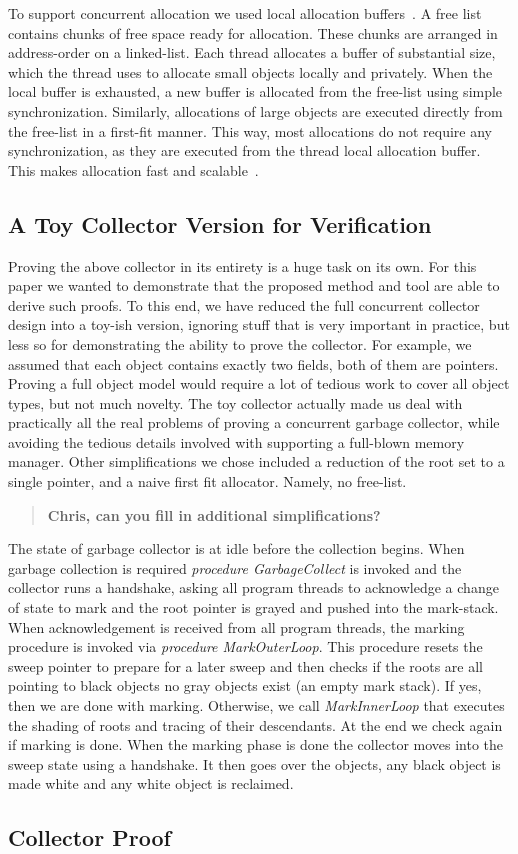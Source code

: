To support concurrent allocation we used local allocation buffers~\cite{borm02a,bara05}. A free list contains chunks of free space ready for allocation. These chunks are arranged in address-order on a linked-list. Each thread allocates a buffer of substantial size, which the thread uses to allocate small objects locally and privately. When the local buffer is exhausted, a new buffer is allocated from the free-list using simple synchronization. Similarly, allocations of large objects are executed directly from the free-list in a first-fit manner. This way, most allocations do not require any synchronization, as they are executed from the thread local allocation buffer. This makes allocation fast and scalable~\cite{borm02a,bara05}. 

\subsection{A Toy Collector Version for Verification}  
Proving the above collector in its entirety is a huge task on its own. For this paper we wanted to demonstrate that the proposed method and tool are able to derive such proofs. To this end, we have reduced the full concurrent collector design into a toy-ish version, ignoring stuff that is very important in practice, but less so for demonstrating the ability to prove the collector. For example, we assumed that each object contains exactly two fields, both of them are pointers. Proving a full object model would require a lot of tedious work to cover all object types, but not much novelty. The toy collector actually made us deal with practically all the real problems of proving a concurrent garbage collector, while avoiding the tedious details involved with supporting a full-blown memory manager. Other simplifications we chose included a reduction of the root set to a single pointer, and a naive first fit allocator. Namely, no free-list. 

\begin{quote}
{\bf Chris, can you fill in additional simplifications?}
\end{quote}

The state of garbage collector is at {\sc idle} before the collection begins. When garbage collection is required {\em procedure GarbageCollect} is invoked and the collector runs a handshake, asking all program threads to acknowledge a change of state to {\sc mark}
and the root pointer is grayed and pushed into the mark-stack. When acknowledgement is received from all program threads, the marking procedure is invoked via {\em procedure MarkOuterLoop}. This procedure resets the sweep pointer to prepare for a later sweep and then checks if the roots are all pointing to black objects no gray objects exist (an empty mark stack). If yes, then we are done with marking. Otherwise, we call {\em MarkInnerLoop} that executes the shading of roots and tracing of  their descendants. At the end we check again if marking is done. When the marking phase is done the collector moves into the {\sc sweep} state using a handshake. It then goes over the objects, any black object is made white and any white object is reclaimed. 

\subsection{Collector Proof}








